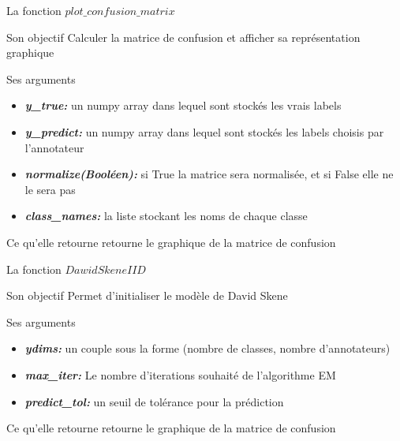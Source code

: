 \documentclass[11pt]{beamer}
\begin{document}
	\begin{frame}{La fonction $plot\_confusion\_matrix$}
		\scriptsize
		\begin{block}{Son objectif}
			Calculer la matrice de confusion et afficher sa représentation graphique
		\end{block}
		\begin{block}{Ses arguments}
			\begin{itemize}
				\item \textbf{\textit{y\_true:}} un numpy array dans lequel sont stockés les vrais labels \\
				\item \textbf{\textit{y\_predict:}} un numpy array dans lequel sont stockés les labels choisis par l'annotateur \\
				\item \textbf{\textit{normalize(Booléen):}} si True la matrice sera normalisée, et si False elle ne le sera pas \\
				\item  \textbf{\textit{class\_names:}} la liste stockant les noms de chaque classe \\
			\end{itemize}
		\end{block}
		\begin{block}{Ce qu'elle retourne}
			retourne le graphique de la matrice de confusion
		\end{block}
	\end{frame}
	
	\begin{frame}{La fonction $DawidSkeneIID$}
		\begin{block}{Son objectif}
			Permet d'initialiser le modèle de David Skene
		\end{block}
		\begin{block}{Ses arguments}
			\begin{itemize}
				\item \textbf{\textit{ydims:}} un couple sous la forme (nombre de classes, nombre d'annotateurs) \\
				\item \textbf{\textit{max\_iter:}} Le nombre d'iterations souhaité de l'algorithme EM \\
				\item  \textbf{\textit{predict\_tol:}} un seuil de tolérance pour la prédiction
			\end{itemize}
		\end{block}
		\begin{block}{Ce qu'elle retourne}
			retourne le graphique de la matrice de confusion
		\end{block}
	\end{frame}
\end{document}
